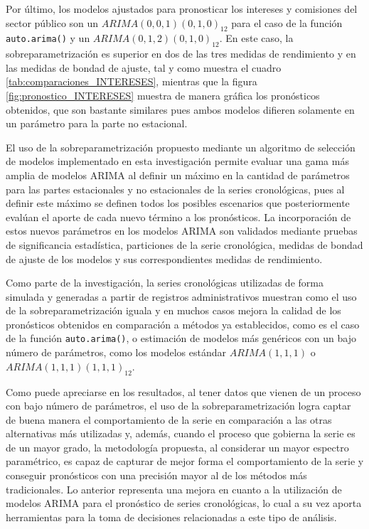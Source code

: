 \documentclass[
]{article}
\begin{document}
Por último, los modelos ajustados para pronosticar los intereses y
comisiones del sector público son un \(ARIMA(0,0,1)(0,1,0)_{12}\) para
el caso de la función \texttt{auto.arima()} y un
\(ARIMA(0,1,2)(0,1,0)_{12}\). En este caso, la sobreparametrización es
superior en dos de las tres medidas de rendimiento y en las medidas de
bondad de ajuste, tal y como muestra el cuadro
\ref{tab:comparaciones_INTERESES}, mientras que la figura
\ref{fig:pronostico_INTERESES} muestra de manera gráfica los pronósticos
obtenidos, que son bastante similares pues ambos modelos difieren
solamente en un parámetro para la parte no estacional.

El uso de la sobreparametrización propuesto mediante un algoritmo de
selección de modelos implementado en esta investigación permite evaluar
una gama más amplia de modelos ARIMA al definir un máximo en la cantidad
de parámetros para las partes estacionales y no estacionales de la
series cronológicas, pues al definir este máximo se definen todos los
posibles escenarios que posteriormente evalúan el aporte de cada nuevo
término a los pronósticos. La incorporación de estos nuevos parámetros
en los modelos ARIMA son validados mediante pruebas de significancia
estadística, particiones de la serie cronológica, medidas de bondad de
ajuste de los modelos y sus correspondientes medidas de rendimiento.

Como parte de la investigación, la series cronológicas utilizadas de
forma simulada y generadas a partir de registros administrativos
muestran como el uso de la sobreparametrización iguala y en muchos casos
mejora la calidad de los pronósticos obtenidos en comparación a métodos
ya establecidos, como es el caso de la función \texttt{auto.arima()}, o
estimación de modelos más genéricos con un bajo número de parámetros,
como los modelos estándar \(ARIMA(1,1,1)\) o
\(ARIMA(1,1,1)(1,1,1)_{12}\).

Como puede apreciarse en los resultados, al tener datos que vienen de un
proceso con bajo número de parámetros, el uso de la sobreparametrización
logra captar de buena manera el comportamiento de la serie en
comparación a las otras alternativas más utilizadas y, además, cuando el
proceso que gobierna la serie es de un mayor grado, la metodología
propuesta, al considerar un mayor espectro paramétrico, es capaz de
capturar de mejor forma el comportamiento de la serie y conseguir
pronósticos con una precisión mayor al de los métodos más tradicionales.
Lo anterior representa una mejora en cuanto a la utilización de modelos
ARIMA para el pronóstico de series cronológicas, lo cual a su vez aporta
herramientas para la toma de decisiones relacionadas a este tipo de
análisis.
\end{document}
